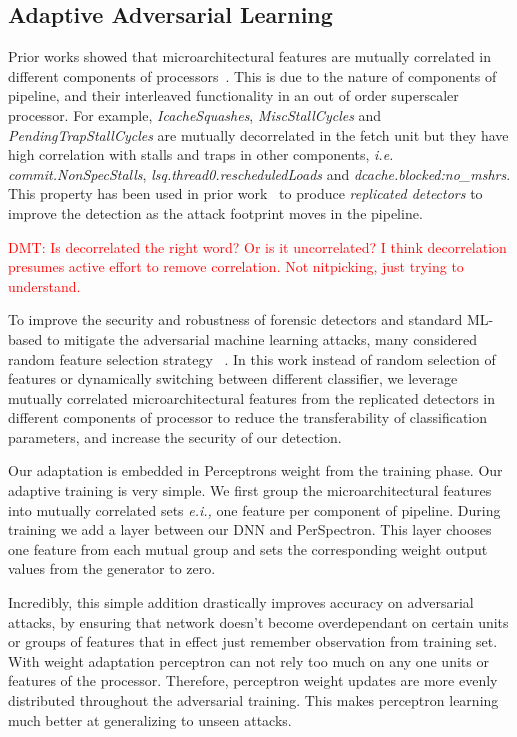  

  

 
\subsection{Adaptive Adversarial Learning}

Prior works showed that microarchitectural features are mutually correlated in different components of processors~\cite{PerSpectron}. This is due to the nature of components of pipeline, and their interleaved functionality in an out of order superscaler processor. For example, \textit{IcacheSquashes}, \textit{MiscStallCycles} and \textit{PendingTrapStallCycles} 
are mutually decorrelated in the fetch unit but they have high correlation with stalls 
and traps in other components, {\em i.e.} \textit{commit.NonSpecStalls}, 
\textit{lsq.thread0.rescheduledLoads} and \textit{dcache.blocked:no\_mshrs}. This property has been used in prior work~\cite{PerSpectron} to produce {\em replicated detectors} to improve the detection as the attack footprint moves in the pipeline.

\textcolor{red}{DMT: Is decorrelated the right word?  Or is it uncorrelated?  I think decorrelation 
presumes active effort to remove correlation.  Not nitpicking, just trying to understand.}


To improve the security and robustness of forensic detectors and
standard ML-based to mitigate the adversarial machine learning attacks, 
many considered random feature selection
strategy
~\cite{nowroozi2020survey, secureDetection2019}.
 In this work instead of random selection of features or  dynamically switching between different classifier, we leverage  mutually correlated microarchitectural features from the replicated detectors in different components of processor to reduce the transferability of classification parameters, and increase the security of our 
detection. 

Our adaptation is embedded in Perceptrons weight from the training phase.  Our adaptive training is very simple. We first group the microarchitectural features into mutually correlated sets {\em e.i.,} one feature per component of pipeline. During training we add a layer between our DNN and PerSpectron. This layer chooses one feature from each mutual group and sets the corresponding weight output values from the  generator to zero.

Incredibly, this simple addition drastically improves accuracy on adversarial attacks, by ensuring that network doesn't become overdependant on certain units or groups of features that in effect just remember observation from training set. With weight adaptation perceptron can not rely too much on any one units or features of the processor. Therefore, perceptron weight updates are more evenly distributed throughout the adversarial training. This makes perceptron learning much better at generalizing to unseen attacks. 

